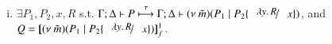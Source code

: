 \begin{proposition}
\begin{enumerate}[1.]
\begin{enumerate}[a)]
\begin{enumerate}[(i)]
			\item $\exists P_1, P_2, x, R$ s.t. 
			$\stytra{ \Gamma }{\tau}{ \Delta }{ P}{ \Delta}{ \news{\tilde{m}}(P_1 \Par P_2\subst{\abs{y}R}{x}) }$, and 
			$Q = \map{\news{\tilde{m}}(P_1 \Par P_2\subst{\abs{y}R}{x})}^{1}_f$.

			\end{enumerate}
		    \end{enumerate}
		    
	\end{enumerate}
\end{proposition}

